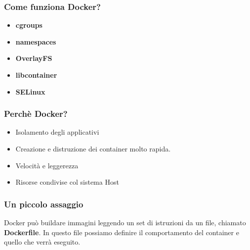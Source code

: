 \documentclass{beamer}
\begin{document}

\begin{frame}
    \frametitle{Come funziona Docker?} 
    \begin{itemize}
        \item<1-> \textbf{cgroups}
        \item<2-> \textbf{namespaces}
        \item<3-> \textbf{OverlayFS}
        \item<4-> \textbf{libcontainer}
        \item<5-> \textbf{SELinux}
    \end{itemize}
\end{frame}


\begin{frame}
    \frametitle{Perch\`e Docker?}
    \begin{itemize}
        \item<1-> Isolamento degli applicativi
        \item<2-> Creazione e distruzione dei container molto rapida. 
        \item<3-> Velocit\`a e leggerezza
        \item<4-> Risorse condivise col sistema Host
    \end{itemize}
\end{frame}


\begin{frame}
    \frametitle{Un piccolo assaggio}
    Docker pu\`o buildare immagini leggendo un set di istruzioni da un file, chiamato \textbf{Dockerfile}.
    In questo file possiamo definire il comportamento del container e quello che verr\`a eseguito.
    
\end{frame}

\end{document}
